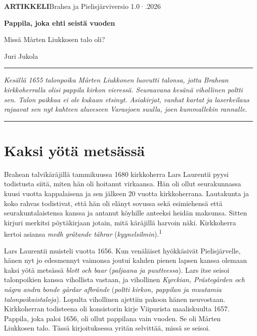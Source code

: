 \documentclass[11pt,a4paper]{article}
\newcommand{\versio}{1.0}
\newcommand{\pvm}{15.10.2026}
\newcommand{\vn}[1]{\textsuperscript{\color{leima}#1}}
\begin{document}
\thispagestyle{eka}
{\sffamily\small\textbf{\color{leima}ARTIKKELI}\enspace Brahea ja Pielisjärvi\enspace versio \versio\enspace·\enspace\pvm\par}
\vspace{1.2em}
{\sffamily\bfseries\fontsize{24}{28}\selectfont\color{meri}Pappila, joka ehti seistä vuoden\par}
\vspace{0.6em}
{\sffamily\large\color{meri}Missä Mårten Liukkosen talo oli?\par}
\vspace{0.5em}
{\sffamily\small Juri Jukola\par}
\vspace{1.0em}
{\color{leima}\rule{\linewidth}{0.8pt}}\par
\vspace{0.3em}
{\itshape
Kesällä 1655 talonpoika Mårten Liukkonen luovutti talonsa, jotta Brahean kirkkoherralla olisi pappila kirkon vieressä. Seuraavana kesänä vihollinen poltti sen. Talon paikkaa ei ole kukaan etsinyt. Asiakirjat, vanhat kartat ja laserkeilaus rajaavat sen nyt kahteen alueeseen Varasjoen suulla, joen kummallekin rannalle.\par}
\vspace{0.4em}
{\color{meri}\rule{\linewidth}{0.4pt}}\par

\section{Kaksi yötä metsässä}

Brahean talvikäräjillä tammikuussa 1680 kirkkoherra Lars Laurentii pyysi todistusta siitä, miten hän oli hoitanut virkaansa. Hän oli ollut seurakunnassa kuusi vuotta kappalaisena ja sen jälkeen 20 vuotta kirkkoherrana. Lautakunta ja koko rahvas todistivat, että hän oli elänyt sovussa sekä esimiehensä että seurakuntalaistensa kanssa ja antanut köyhille anteeksi heidän maksunsa. Sitten kirjuri merkitsi pöytäkirjaan jotain, mitä käräjillä harvoin näki. Kirkkoherra kertoi asiansa \emph{medh gråtande tåhrar} (\emph{kyynelsilmin}).\vn{1}

Lars Laurentii muisteli vuotta 1656. Kun venäläiset hyökkäsivät Pielisjärvelle, hänen nyt jo edesmennyt vaimonsa joutui kahden pienen lapsen kanssa olemaan kaksi yötä metsässä \emph{blott och baar} (\emph{paljaana ja puutteessa}). Lars itse seisoi talonpoikien kanssa vihollista vastaan, ja vihollinen \emph{Kyrckian, Prästegården och några andra bonde gårdar afbrände} (\emph{poltti kirkon, pappilan ja muutamia talonpoikaistaloja}). Lopulta vihollinen ajettiin pakoon hänen neuvostaan. Kirkkoherran todisteena oli konsistorin kirje Viipurista maaliskuulta 1657. Pappila, joka paloi 1656, oli ollut pappilana vain vuoden. Se oli Mårten Liukkosen talo. Tässä kirjoituksessa yritän selvittää, missä se seisoi.
\end{document}
